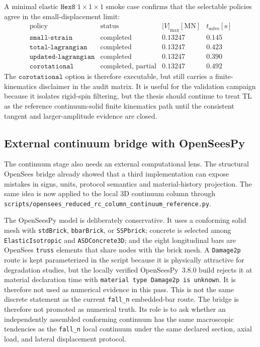 A minimal elastic \(\texttt{Hex8}\;1\times1\times1\) smoke case confirms that
the selectable policies agree in the small-displacement limit:
\[
\begin{array}{l|c|r|r}
\text{policy} & \text{status} & |V|_{\max}[\mathrm{MN}] &
t_{\mathrm{solve}}[\mathrm{s}]\\
\hline
\texttt{small-strain} & \text{completed} & 0.13247 & 0.145\\
\texttt{total-lagrangian} & \text{completed} & 0.13247 & 0.423\\
\texttt{updated-lagrangian} & \text{completed} & 0.13247 & 0.390\\
\texttt{corotational} & \text{completed, partial} & 0.13247 & 0.492
\end{array}
\]
The \(\texttt{corotational}\) option is therefore executable, but still carries
a finite-kinematics disclaimer in the audit matrix. It is useful for the
validation campaign because it isolates rigid-spin filtering, but the thesis
should continue to treat TL as the reference continuum-solid finite
kinematics path until the consistent tangent and larger-amplitude evidence are
closed.

\subsection{External continuum bridge with OpenSeesPy}

The continuum stage also needs an external computational lens.  The structural
OpenSees bridge already showed that a third implementation can expose mistakes
in signs, units, protocol semantics and material-history projection.  The
same idea is now applied to the local 3D continuum column through
\texttt{scripts/opensees\_reduced\_rc\_column\_continuum\_reference.py}.

The OpenSeesPy model is deliberately conservative.  It uses a conforming solid
mesh with \texttt{stdBrick}, \texttt{bbarBrick}, or \texttt{SSPbrick}; concrete
is selected among \texttt{ElasticIsotropic} and \texttt{ASDConcrete3D}; and
the eight longitudinal bars are OpenSees \texttt{truss} elements that share
nodes with the brick mesh.  A \texttt{Damage2p} route is kept parameterized in
the script because it is physically attractive for degradation studies, but
the locally verified OpenSeesPy~3.8.0 build rejects it at material declaration
time with \texttt{material type Damage2p is unknown}. It is therefore not used
as numerical evidence in this pass. This is not the
same discrete statement as the current \texttt{fall\_n} embedded-bar route.
The bridge is therefore not promoted as numerical truth.  Its role is to ask
whether an independently assembled conforming continuum has the same
macroscopic tendencies as the \texttt{fall\_n} local continuum under the same
declared section, axial load, and lateral displacement protocol.

